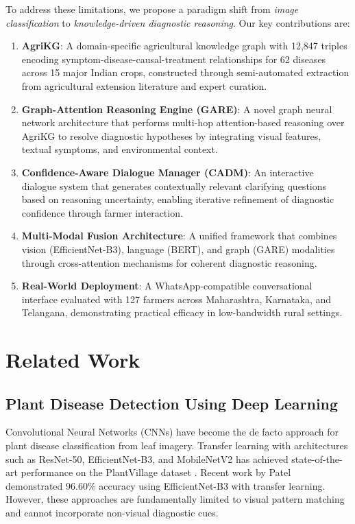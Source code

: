 \documentclass[conference]{IEEEtran}
\begin{document}
To address these limitations, we propose a paradigm shift from \textit{image classification} to \textit{knowledge-driven diagnostic reasoning}. Our key contributions are:

\begin{enumerate}
    \item \textbf{AgriKG}: A domain-specific agricultural knowledge graph with 12,847 triples encoding symptom-disease-causal-treatment relationships for 62 diseases across 15 major Indian crops, constructed through semi-automated extraction from agricultural extension literature and expert curation.

    \item \textbf{Graph-Attention Reasoning Engine (GARE)}: A novel graph neural network architecture that performs multi-hop attention-based reasoning over AgriKG to resolve diagnostic hypotheses by integrating visual features, textual symptoms, and environmental context.

    \item \textbf{Confidence-Aware Dialogue Manager (CADM)}: An interactive dialogue system that generates contextually relevant clarifying questions based on reasoning uncertainty, enabling iterative refinement of diagnostic confidence through farmer interaction.

    \item \textbf{Multi-Modal Fusion Architecture}: A unified framework that combines vision (EfficientNet-B3), language (BERT), and graph (GARE) modalities through cross-attention mechanisms for coherent diagnostic reasoning.

    \item \textbf{Real-World Deployment}: A WhatsApp-compatible conversational interface evaluated with 127 farmers across Maharashtra, Karnataka, and Telangana, demonstrating practical efficacy in low-bandwidth rural settings.
\end{enumerate}

\section{Related Work}
\label{sec:related}

\subsection{Plant Disease Detection Using Deep Learning}

Convolutional Neural Networks (CNNs) have become the de facto approach for plant disease classification from leaf imagery. Transfer learning with architectures such as ResNet-50, EfficientNet-B3, and MobileNetV2 has achieved state-of-the-art performance on the PlantVillage dataset \cite{efficientnet_agri}. Recent work by Patel \cite{agrosense} demonstrated 96.60\% accuracy using EfficientNet-B3 with transfer learning. However, these approaches are fundamentally limited to visual pattern matching and cannot incorporate non-visual diagnostic cues.
\end{document}
